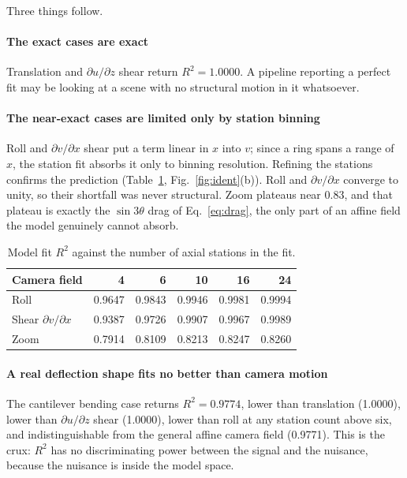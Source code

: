\documentclass[preprint,12pt]{elsarticle}
\begin{document}
Three things follow.

\paragraph{The exact cases are exact}
Translation and $\partial u/\partial z$ shear return $R^2 = 1.0000$. A
pipeline reporting a perfect fit may be looking at a scene with no
structural motion in it whatsoever.

\paragraph{The near-exact cases are limited only by station binning}
Roll and $\partial v/\partial x$ shear put a term linear in $x$ into $v$;
since a ring spans a range of $x$, the station fit absorbs it only to
binning resolution. Refining the stations confirms the prediction
(Table~\ref{tab:stations}, Fig.~\ref{fig:ident}(b)). Roll and
$\partial v/\partial x$ converge to unity, so their shortfall was never
structural. Zoom plateaus near 0.83, and that plateau is exactly the
$\sin 3\theta$ drag of Eq.~\eqref{eq:drag}, the only part of an affine field
the model genuinely cannot absorb.

\begin{table}[htbp]
\centering
\caption{Model fit $R^2$ against the number of axial stations in the fit.}
\label{tab:stations}
\begin{tabular}{lrrrrr}
\toprule
Camera field & 4 & 6 & 10 & 16 & 24\\
\midrule
Roll                          & 0.9647 & 0.9843 & 0.9946 & 0.9981 & 0.9994\\
Shear $\partial v/\partial x$ & 0.9387 & 0.9726 & 0.9907 & 0.9967 & 0.9989\\
Zoom                          & 0.7914 & 0.8109 & 0.8213 & 0.8247 & 0.8260\\
\bottomrule
\end{tabular}
\end{table}

\paragraph{A real deflection shape fits no better than camera motion}
The cantilever bending case returns $R^2 = 0.9774$, lower than translation
(1.0000), lower than $\partial u/\partial z$ shear (1.0000), lower than roll
at any station count above six, and indistinguishable from the general
affine camera field (0.9771). This is the crux: $R^2$ has no discriminating
power between the signal and the nuisance, because the nuisance is inside
the model space.
\end{document}
